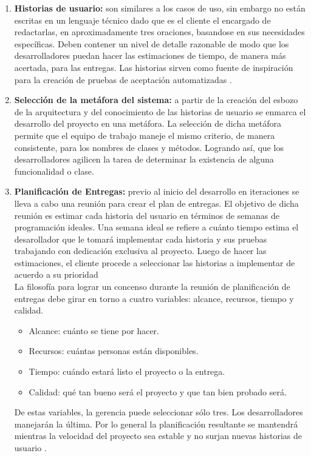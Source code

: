 \begin{enumerate}
	\item \textbf{Historias de usuario:} son similares a los casos de uso, sin embargo no están escritas en un lenguaje técnico dado que es el cliente el encargado de redactarlas, en aproximadamente tres oraciones, basandose en sus necesidades específicas. Deben contener un nivel de detalle razonable de modo que los desarrolladores puedan hacer las estimaciones de tiempo, de manera más acertada, para las entregas. Las historias sirven como fuente de inspiración para la creación de pruebas de aceptación automatizadas \citep{Metodologia_XP_historias2006}.
	
	\item \textbf{Selección de la metáfora del sistema:} a partir de la creación del esbozo de la arquitectura y del conocimiento de las historias de usuario se enmarca el desarrollo del proyecto en una metáfora. La selección de dicha metáfora permite que el equipo de trabajo maneje el mismo criterio, de manera consistente, para los nombres de clases y métodos. Logrando así, que los desarrolladores agilicen la tarea de determinar la existencia de alguna funcionalidad o clase. \citep{Metodologia_XP_metafora2006}

	\item \textbf{Planificación de Entregas:} previo al inicio del desarrollo en iteraciones se lleva a cabo una reunión para crear el plan de entregas. El objetivo de dicha reunión es estimar cada historia del usuario en términos de semanas de programación ideales. Una semana ideal se refiere a cuánto tiempo estima el desarollador que le tomará implementar cada historia y sus pruebas trabajando con dedicación exclusiva al proyecto. Luego de hacer las estimaciones, el cliente procede a seleccionar las historias a implementar de acuerdo a su prioridad \citep{Metodologia_XP_entregas20061} \\ La filosofía para lograr un concenso durante la reunión de planificación de entregas debe girar en torno a cuatro variables: alcance, recursos, tiempo y calidad.
	\begin{itemize}
		\item Alcance: cuánto se tiene por hacer.
		\item Recursos: cuántas personas están disponibles.
		\item Tiempo: cuándo estará listo el proyecto o la entrega.
		\item Calidad: qué tan bueno será el proyecto y que tan bien probado será.
	\end{itemize}
	De estas variables, la gerencia puede seleccionar sólo tres. Los desarrolladores manejarán la última. Por lo general la planificación resultante se mantendrá mientras la velocidad del proyecto sea estable y no surjan nuevas historias de usuario \citep{Metodologia_XP_entregas20062}.


\end{enumerate}
